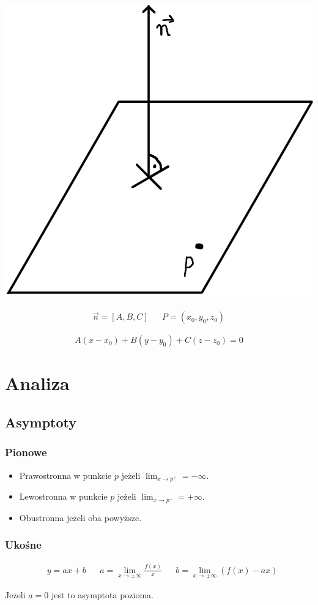 \documentclass[11pt]{article}
\begin{document}
\begin{center}
\includegraphics[width=.9\linewidth]{figures/plaszczyzna.png}
\end{center}

\begin{latex}
\begin{align*}
\vec{n}=[A,B,C] && P=(x_{0}, y_{0}, z_{0})
\end{align*}
\end{latex}

$$A(x - x_{0}) + B(y-y_{0}) + C(z - z_{0}) = 0$$
\section{Analiza}
\label{sec:org26b2d8a}
\subsection{Asymptoty}
\label{sec:org28784e0}
\subsubsection{Pionowe}
\label{sec:org29e8fa1}
\begin{itemize}
\item Prawostronna w punkcie \(p\)
jeżeli \(\lim_{x \to p^+} = - \infty\).
\item Lewostronna w punkcie \(p\)
jeżeli \(\lim_{x \to p^-} = + \infty\).
\item Obustronna  jeżeli oba powyższe.
\end{itemize}
\subsubsection{Ukośne}
\label{sec:org71f7709}
\begin{latex}
\begin{align*}
  & y = ax +b
  && a = \lim_{x \to \pm \infty} \frac{f(x)}{x}
  && b = \lim_{x \to \pm \infty } \left( f(x) -ax \right)
\end{align*}
\end{latex}
Jeżeli \(a = 0\) jest to asymptota pozioma.
\end{document}
